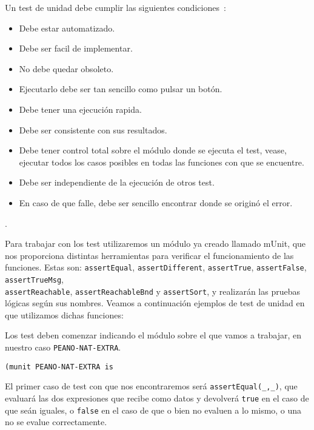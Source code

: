 Un test de unidad debe cumplir las siguientes condiciones~\cite{unitTests}: \par

\begin{itemize}
\item Debe estar automatizado.
\item Debe ser facil de implementar.
\item No debe quedar obsoleto.
\item Ejecutarlo debe ser tan sencillo como pulsar un botón.
\item Debe tener una ejecución rapida.
\item Debe ser consistente con sus resultados. 
\item Debe tener control total sobre el módulo donde se ejecuta el test, vease, ejecutar todos los casos posibles en todas las funciones con que se encuentre.
\item Debe ser independiente de la ejecución de otros test.
\item En caso de que falle, debe ser sencillo encontrar donde se originó el error.
\end{itemize}.

Para trabajar con los test utilizaremos un módulo ya creado llamado mUnit, que nos proporciona distintas herramientas para verificar el funcionamiento de las funciones. Estas son: \verb"assertEqual", \verb"assertDifferent", \verb"assertTrue", \verb"assertFalse", \verb"assertTrueMsg",\\ \verb"assertReachable", \verb"assertReachableBnd" y \verb"assertSort", y realizarán las pruebas lógicas según sus nombres. Veamos a continuación ejemplos de test de unidad en que utilizamos dichas funciones:\par

Los test deben comenzar indicando el módulo sobre el que vamos a trabajar, en nuestro caso \texttt{PEANO-NAT-EXTRA}. \par

{\codesize
\begin{verbatim}
(munit PEANO-NAT-EXTRA is
\end{verbatim}
}

El primer caso de test con que nos encontraremos será \verb"assertEqual(_,_)", que evaluará las dos expresiones que recibe como datos y devolverá \texttt{true} en el caso de que seán iguales, o \texttt{false} en el caso de que o bien no evaluen a lo mismo, o una no se evalue correctamente. \par

